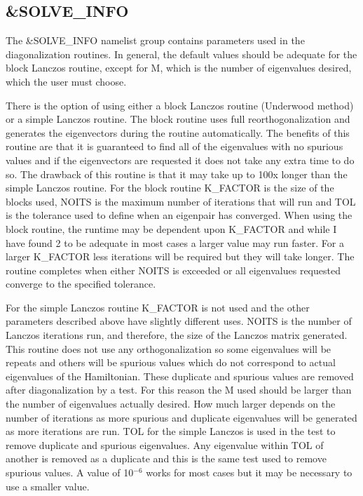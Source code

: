 \documentclass{article}
\begin{document}
\subsection{\&SOLVE\_INFO}

The \&SOLVE\_INFO namelist group contains parameters used in the
diagonalization routines. In general, the default values should be
adequate for the block Lanczos routine, except for M, which is the number of eigenvalues desired,
which the user must choose. 

There is the option of using either a block Lanczos routine (Underwood method) or a simple Lanczos routine. The block routine
uses full reorthogonalization and generates the eigenvectors during the routine
automatically. The benefits of this routine are that it is guaranteed to find all
of the eigenvalues with no spurious values and if the eigenvectors are requested
it does not take any extra time to do so.  The drawback of this routine is that it
may take up to 100x longer than the simple Lanczos routine. For the block routine
K\_FACTOR is the size of the blocks used, NOITS is the maximum number of iterations
that will run and TOL is the tolerance used to define when an eigenpair has converged.
When using the block routine, the runtime may be dependent upon K\_FACTOR and while
I have found 2 to be adequate in most cases a larger value may run faster.  For a 
larger K\_FACTOR less iterations will be required but they will take longer.  The routine
completes when either NOITS is exceeded or all eigenvalues requested converge to the 
specified tolerance.

For the simple Lanczos routine K\_FACTOR is not used and the other parameters described above
have slightly different uses. NOITS is the number of Lanczos iterations run, and therefore, the
size of the Lanczos matrix generated. This routine does not use any orthogonalization so some
eigenvalues will be repeats and others will be spurious values which do not correspond to actual
eigenvalues of the Hamiltonian. These duplicate and spurious values are removed after diagonalization
by a test. For this reason the M used should be larger than the number of eigenvalues actually
desired. How much larger depends on the number of iterations as more spurious and duplicate
eigenvalues will be generated as more iterations are run. TOL for the simple Lanczos is used
in the test to remove duplicate and spurious eigenvalues. Any eigenvalue within TOL of another
is removed as a duplicate and this is the same test used to remove spurious values. A value
of 10$^{-6}$ works for most cases but it may be necessary to use a smaller value.
\end{document}
